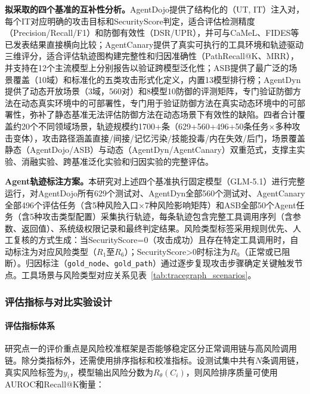 \textbf{拟采取的四个基准的互补性分析。}AgentDojo提供了结构化的（UT, IT）注入对，每个IT对应明确的攻击目标和SecurityScore判定，适合评估检测精度（Precision/Recall/F1）和防御有效性（DSR/UPR），并可与CaMeL\cite{debenedetti2025camel}、FIDES\cite{costa2025fides}等已发表结果直接横向比较；AgentCanary提供了真实可执行的工具环境和轨迹驱动三维评分，适合评估轨迹图构建完整性和归因准确性（PathRecall@K、MRR），并支持在12个主流模型上分别报告以验证跨模型泛化性；ASB提供了最广泛的场景覆盖（10域）和标准化的五类攻击形式化定义，内置13模型排行榜；AgentDyn提供了动态开放场景（3域，560对）和8模型10防御的评测矩阵，专门验证防御方法在动态真实环境中的可部署性，专门用于验证防御方法在真实动态环境中的可部署性，弥补了静态基准无法评估防御方法在动态场景下有效性的缺陷。四者合计覆盖约20个不同领域场景，轨迹规模约1700+条（629+560+496+50条任务×多种攻击变体），攻击路径涵盖直接/间接/记忆污染/技能投毒/内在失效/后门，场景覆盖静态（AgentDojo/ASB）与动态（AgentDyn/AgentCanary）双重范式，支撑主实验、消融实验、跨基准泛化实验和归因实验的完整评估。

\textbf{Agent轨迹标注方案。}本研究对上述四个基准执行固定模型（GLM-5.1）进行完整运行，对AgentDojo所有629个测试对、AgentDyn全部560个测试对、AgentCanary全部496个评估任务（含5种风险入口×7种风险影响矩阵）和ASB全部50个Agent任务（含5种攻击类型配置）采集执行轨迹，每条轨迹包含完整工具调用序列（含参数、返回值）、系统级权限记录和最终判定结果。风险类型标签采用规则优先、人工复核的方式生成：当SecurityScore=0（攻击成功）且存在特定工具调用时，自动标注为对应风险类型（$R_1$至$R_6$）；SecurityScore>0时标注为$R_0$（正常或已阻断）。归因标注（\texttt{gold\_node}、\texttt{gold\_path}）通过逐步复现攻击步骤确定关键触发节点。工具场景与风险类型对应关系见表~\ref{tab:tracegraph_scenarios}。



\subsubsection{评估指标与对比实验设计}

\paragraph{评估指标体系}

研究点一的评价重点是风险校准框架是否能够稳定区分正常调用链与高风险调用链。除分类指标外，还需使用排序指标和校准指标。设测试集中共有$N$条调用链，真实风险标签为$y_i$，模型输出风险分数为$R_\theta(C_i)$，则风险排序质量可使用AUROC和Recall@K衡量：


